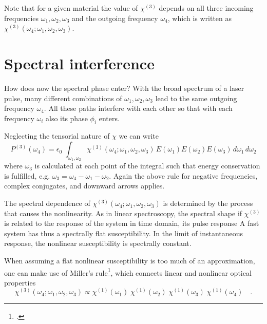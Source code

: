 Note that for a given material the value of $\chi^{(3)} $ depends on all three incoming frequencies $\omega_1, \omega_2, \omega_3$ and the outgoing frequency $\omega_4$, which is written as  $\chi^{(3)}(\omega_4; \omega_1, \omega_2, \omega_3)$. 

\section{Spectral interference}

How does now the spectral phase enter? With the broad spectrum of  a laser pulse, many different combinations of $\omega_1, \omega_2, \omega_3$ lead to the same outgoing frequency $\omega_4$. All these paths interfere with each other so that with each frequency $\omega_i$ also its phase $\phi_i$ enters.

Neglecting the tensorial nature of $\chi$ we can write
\begin{equation}
  P^{(3)}(\omega_4) = \epsilon_0 \; 
    \int_{\omega_1, \omega_2} \chi^{(3)}(\omega_4; \omega_1, \omega_2, \omega_3) \,  E(\omega_1) E(\omega_2) E(\omega_3) \, d\omega_1 \, d\omega_2  
\end{equation}	
where $\omega_3$ is calculated at each point of the integral such that energy conservation is fulfilled, e.g. $\omega_3 = \omega_4 - \omega_1 - \omega_2$. Again the above rule for negative frequencies, complex conjugates, and downward arrows applies.

The spectral dependence of $\chi^{(3)}(\omega_4; \omega_1, \omega_2, \omega_3)$ is determined by the process that causes the nonlinearity. As in linear spectroscopy, the spectral shape if  $\chi^{(3)}$ is related to the response of the system in time domain, its pulse response A fast system has thus a spectrally flat susceptibility. In the limit of instantaneous response, the nonlinear susceptibility is spectrally constant.
		
When assuming a flat nonlinear susceptibility is too much of an approximation, one can make use of Miller's rule\footcite{Boyd2008,Miller64,Obermeier18}, which connects linear and nonlinear optical properties
\begin{equation}
  \chi^{(3)}(\omega_4; \omega_1, \omega_2, \omega_3) \propto  \chi^{(1)}(\omega_1) \;   \chi^{(1)}(\omega_2)  \;   \chi^{(1)}(\omega_3)  \;   \chi^{(1)}(\omega_4)  \quad .
 \end{equation}
 		

 
\printbibliography[segment=\therefsegment,heading=subbibliography]

